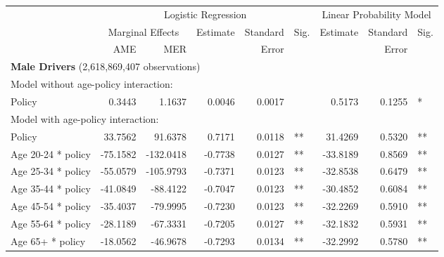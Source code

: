 
\begin{table}%
\centering 
\begin{tabular}{l r r r r l r r l} 

\hline 
 
 & \multicolumn{5}{c}{Logistic Regression}  & \multicolumn{3}{c}{Linear Probability Model} \\ 

 \cmidrule(lr){2-6}\cmidrule(lr){7-9} 
 & \multicolumn{2}{c}{Marginal Effects} & Estimate & Standard & Sig. & Estimate & Standard & Sig. \\ 

 \cmidrule(lr){2-3} 
 &   AME &  MER  &          &  Error   &      &          &  Error   &     \\ 

\hline 
 
\multicolumn{8}{l}{\textbf{Male Drivers} (2,618,869,407 observations)} \\ 

\hline
\multicolumn{8}{l}{Model without age-policy interaction: } \\ 
Policy                   &  0.3443        &  1.1637       &  0.0046        &  0.0017       &            &  0.5173        &  0.1255       &    *       \\ 
\hline
\multicolumn{8}{l}{Model with age-policy interaction: } \\ 
Policy                   &  33.7562        &  91.6378       &  0.7171        &  0.0118       &   **       &  31.4269        &  0.5320       &   **       \\ 
Age 20-24 * policy   &  -75.1582        &  -132.0418       &  -0.7738        &  0.0127       &   **       &  -33.8189        &  0.8569       &   **       \\ 
Age 25-34 * policy   &  -55.0579        &  -105.9793       &  -0.7371        &  0.0123       &   **       &  -32.8538        &  0.6479       &   **       \\ 
Age 35-44 * policy   &  -41.0849        &  -88.4122       &  -0.7047        &  0.0123       &   **       &  -30.4852        &  0.6084       &   **       \\ 
Age 45-54 * policy   &  -35.4037        &  -79.9995       &  -0.7230        &  0.0123       &   **       &  -32.2269        &  0.5910       &   **       \\ 
Age 55-64 * policy   &  -28.1189        &  -67.3331       &  -0.7205        &  0.0127       &   **       &  -32.1832        &  0.5931       &   **       \\ 
Age 65+ * policy   &  -18.0562        &  -46.9678       &  -0.7293        &  0.0134       &   **       &  -32.2992        &  0.5780       &   **       \\ 


\end{tabular}
\end{table}
